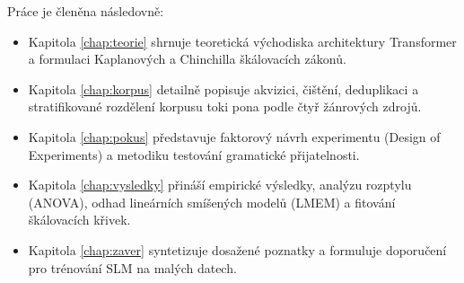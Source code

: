 Práce je členěna následovně:
\begin{itemize}
    \item Kapitola \ref{chap:teorie} shrnuje teoretická východiska architektury Transformer a formulaci Kaplanových a Chinchilla škálovacích zákonů.
    \item Kapitola \ref{chap:korpus} detailně popisuje akvizici, čištění, deduplikaci a stratifikované rozdělení korpusu toki pona podle čtyř žánrových zdrojů.
    \item Kapitola \ref{chap:pokus} představuje faktorový návrh experimentu (Design of Experiments) a metodiku testování gramatické přijatelnosti.
    \item Kapitola \ref{chap:vysledky} přináší empirické výsledky, analýzu rozptylu (ANOVA), odhad lineárních smíšených modelů (LMEM) a fitování škálovacích křivek.
    \item Kapitola \ref{chap:zaver} syntetizuje dosažené poznatky a formuluje doporučení pro trénování SLM na malých datech.
\end{itemize}
